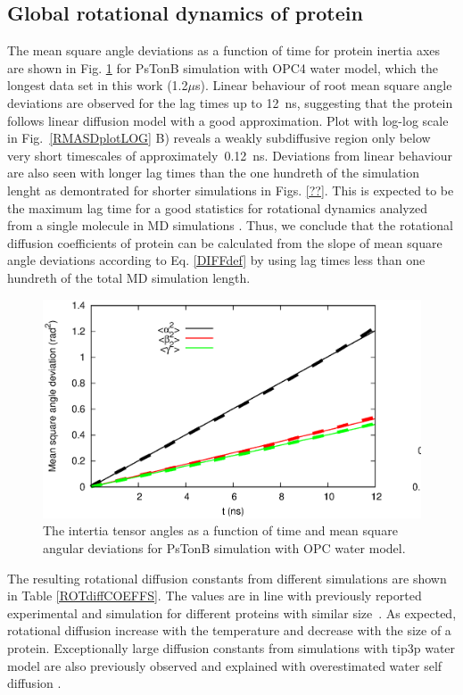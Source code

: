 \documentclass[pre,aps,floatfix,authordate1-4,twocolumn]{revtex4-1}
\begin{document}
\subsection{Global rotational dynamics of protein}
The mean square angle deviations as a function of time
for protein inertia axes are shown in Fig. \ref{RMASDplot}
for PsTonB simulation with OPC4 water model, which the longest
data set in this work (1.2$\mu$s).
Linear behaviour of root mean square angle deviations are observed
for the lag times up to 12~ns, suggesting that the protein follows linear diffusion model with a
good approximation. Plot with log-log scale in Fig.~\ref{RMASDplotLOG} B)
reveals a weakly subdiffusive region only below very short timescales
of approximately~0.12~ns. Deviations from linear behaviour are also
seen with longer lag times than the one hundreth of the simulation lenght as
demontrated for shorter simulations in Figs. \ref{??}.
This is expected to be the maximum lag time for a good statistics
for rotational dynamics analyzed from a single molecule in MD simulations \cite{lu06}.
Thus, we conclude that the rotational diffusion coefficients of protein can
be calculated from the slope of mean square angle
deviations according to Eq. \ref{DIFFdef} by using lag times less than
one hundreth of the total MD simulation length.
\begin{figure}[htb]
  \includegraphics[width=16.5cm]{../Figs/RMASDplotPsTonBOPC4.eps}%
  \caption{The intertia tensor angles as a function of time and mean square angular
    deviations for PsTonB simulation with OPC water model.
    \label{RMASDplot}}%
\end{figure}

The resulting rotational diffusion constants from different simulations are
shown in Table \ref{ROTdiffCOEFFS}. The values are in line with
previously reported experimental and simulation for different proteins
with similar size~\cite{wong08,krishnan98}. As expected,
rotational diffusion increase with the temperature and decrease with the
size of a protein.  Exceptionally large diffusion constants from simulations
with tip3p water model are also previously observed and explained with
overestimated water self diffusion \cite{wong08}.
\end{document}
